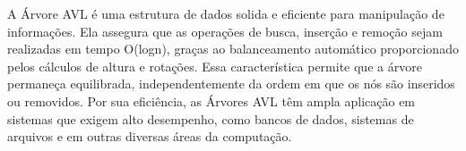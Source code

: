 \vspace{3mm}

A Árvore AVL é uma estrutura de dados solida e eficiente para manipulação de informações. 
Ela assegura que as operações de busca, inserção e remoção sejam realizadas em tempo 
O(logn), graças ao balanceamento automático proporcionado pelos cálculos de altura e rotações. 
Essa característica permite que a árvore permaneça equilibrada, independentemente da ordem em que os nós são inseridos ou removidos. 
Por sua eficiência, as Árvores AVL têm ampla aplicação em sistemas que exigem alto desempenho,
como bancos de dados, sistemas de arquivos e em outras diversas áreas da computação.
